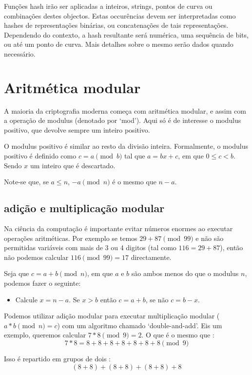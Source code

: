 Funções hash irão ser aplicadas a inteiros, strings, pontos de curva ou combinações destes objectos. Estas occurências devem ser interpretadas como hashes de representações binárias, ou concatenações de tais representações. Dependendo do contexto, a hash resultante será numérica, uma sequência de bits, ou até um ponto de curva. Mais detalhes sobre o mesmo serão dados quando necessário.

\section{Aritmética modular}
\label{sec:modular-arithmetic}

A maioria da criptografia moderna começa com aritmética modular, e assim com a operação de modulus (denotado por `mod'). Aqui só é de interesse o modulus positivo, que devolve sempre um inteiro positivo.

O modulus positivo é similar ao resto da divisão inteira.
Formalmente, o modulus positivo é definido como $c = a \pmod b$ tal que $a=bx+c$, em que $0\leq{c}<{b}$. Sendo $x$ um inteiro que é descartado.

Note-se que, se $a \leq n$, $-a \pmod n$ é o mesmo que $n - a$.


\subsection{adição e multiplicação modular}
\label{subsec:modular-addition-multiplication}

Na ciência da computação é importante evitar números enormes ao executar operações aritméticas. Por exemplo se temos $29+87 \pmod{99}$ e não são permitidas variáveis com mais de 3 ou 4 digitos (tal como $116 = 29+87$), então não podemos calcular $116 \pmod{99} = 17$ directamente.

Seja que $c = a+b \pmod n$, em que $a$ e $b$ são ambos menos do que o modulus $n$, podemos fazer o seguinte:
\begin{itemize}
	\item Calcule $x = n-a$. Se $x > b$ então $c = a+b$, se não $c = b - x$.
\end{itemize}

Podemos utilizar adição modular para executar multiplicação modular ($a*b \pmod n = c$) com um algoritmo chamado `double-and-add'. Eis um exemplo, queremos calcular $7*8 \pmod 9 = 2$. O que é o mesmo que :
\[7*8 = 8+8+8+8+8+8+8 \pmod 9\]

Isso é repartido em grupos de dois :
\[(8+8) + (8+8) + (8+8) + 8\]

